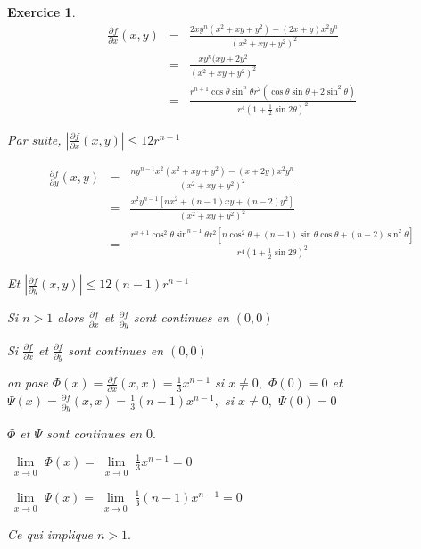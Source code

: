 \documentclass[11pt,a4paper]{report}
\newtheorem{exo}{Exercice}[section]
\begin{document}
\begin{exo}
\begin{eqnarray*}
\frac{\partial f}{\partial x}(x,y)
&=&\frac{2xy^n(x^2+xy+y^2)-(2x+y)x^2 y^n}{(x^2+xy+y^2)^2}\\
&=& \frac{xy^n(xy+2y^2}{(x^2+xy+y^2)^2}\\
&=& \frac{r^{n+1}\cos\theta \sin^n \theta r^2 (\cos \theta\sin \theta+2\sin^2\theta)}{r^4 (1+\frac{1}{2}\sin2\theta)^2}
\end{eqnarray*}

Par suite, $|\frac{\partial f}{\partial x}(x,y)|\leq 12 r^{n-1}$

\begin{eqnarray*}
\frac{\partial f}{\partial y}(x,y)
&=&\frac{n y^{n-1}x^2 (x^2+xy+y^2)-(x+2y)x^2 y^n}{(x^2+xy+y^2)^2}\\
&=&\frac{x^2 y^{n-1}[nx^2+(n-1)xy+(n-2)y^2]}{(x^2+xy+y^2)^2}\\
&=& \frac{r^{n+1}\cos^2\theta \sin^{n-1}\theta r^2[n\cos^2\theta+(n-1)\sin\theta\cos\theta+(n-2)\sin^2\theta]}{r^4(1+\frac{1}{2}\sin2\theta)^2}
\end{eqnarray*}

Et $|\frac{\partial f}{\partial y}(x,y)|\leq12(n-1)r^{n-1}$

Si $n>1$ alors $\frac{\partial f}{\partial x}$ et $\frac{\partial f}{\partial y}$ sont continues en $(0,0)$

Si $\frac{\partial f}{\partial x}$ et $\frac{\partial f}{\partial y}$ sont continues en $(0,0)$

on pose $\Phi(x)=\frac{\partial f}{\partial x}(x,x)=\frac{1}{3}x^{n-1}$ si $x\neq0,$ $\Phi(0)=0$ et $\Psi(x)=\frac{\partial f}{\partial y}(x,x)=\frac{1}{3}(n-1)x^{n-1},$ si $x\neq0,$ $\Psi(0)=0$

$\Phi$ et $\Psi$ sont continues en $0.$

$\lim\limits_{\substack{x\rightarrow0}}\Phi(x)=\lim\limits_{\substack{x\rightarrow0}}\frac{1}{3}x^{n-1}=0$


$\lim\limits_{\substack{x\rightarrow0}}\Psi(x)=\lim\limits_{\substack{x\rightarrow0}}\frac{1}{3}(n-1)x^{n-1}=0$

Ce qui implique $n>1.$

\end{exo}
\end{document}
